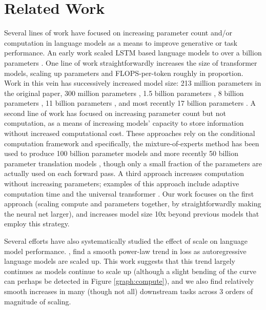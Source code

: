 \documentclass{article}
\begin{document}
\section{Related Work}
\label{section:Related Work}
Several lines of work have focused on increasing parameter count and/or computation in language models as a means to improve generative or task performance. An early work scaled LSTM based language models to over a billion parameters \cite{jozefowicz2016exploring}. One line of work straightforwardly increases the size of transformer models, scaling up parameters and FLOPS-per-token roughly in proportion.  Work in this vein has successively increased model size: 213 million parameters \cite{vaswani2017attention} in the original paper, 300 million parameters \cite{devlin2018bert}, 1.5 billion parameters \cite{radford2019language}, 8 billion parameters  \cite{shoeybi2019megatronlm}, 11 billion parameters \cite{raffel2019t5}, and most recently 17 billion parameters \cite{turing_17m}.  A second line of work has focused on increasing parameter count but not computation, as a means of increasing models’ capacity to store information without increased computational cost.  These approaches rely on the conditional computation framework \cite{bengio2013cond} and specifically, the mixture-of-experts method \cite{shazeer2017outrageously} has been used to produce 100 billion parameter models and more recently 50 billion parameter translation models \cite{aharoni201950B}, though only a small fraction of the parameters are actually used on each forward pass. A third approach increases computation without increasing parameters; examples of this approach include adaptive computation time \cite{graves2016act} and  the universal transformer \cite{dehghani2018ut}. Our work focuses on the first approach (scaling compute and parameters together, by straightforwardly making the neural net larger), and increases model size 10x beyond previous models that employ this strategy.

Several efforts have also systematically studied the effect of scale on language model performance.  \cite{kaplan2020scaling,rosenfeld2019constructive,li2020train,hestness2017deep}, find a smooth power-law trend in loss as autoregressive language models are scaled up.  This work suggests that this trend largely continues as models continue to scale up (although a slight bending of the curve can perhaps be detected in Figure \ref{graph:compute}), and we also find relatively smooth increases in many (though not all) downstream tasks across 3 orders of magnitude of scaling.
\end{document}
